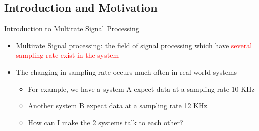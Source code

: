 \documentclass{beamer}
\begin{document}
\subsection{Introduction and Motivation}
\begin{frame}[t,allowframebreaks]{Introduction to Multirate Signal Processing}

\begin{itemize}

\item Multirate Signal processing: the field of signal processing which have \textcolor{red}{several sampling rate exist in the system} \cite{DSP_DimitrisManolakis}

\item The changing in sampling rate occurs much often in real world systems

    \begin{itemize}
        \item For example, we have a system A expect data at a sampling rate 10 KHz
        
        \item Another system B expect data at a sampling rate 12 KHz
        
        \item How can I make the 2 systems talk to each other?
        
    \end{itemize}

\end{itemize}


\end{frame}
\end{document}
